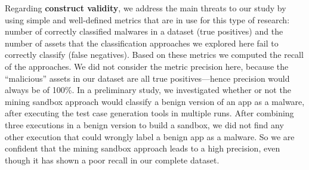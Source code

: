 \begin{comment}
    
Regarding the \textbf{correlation between dataset properties and accuracy drop}, after running statistical tests (logistic regression),
we could not find evidence that the \emph{diversity} of the
complete dataset---in terms of similarity score and types of malware-
is responsible for the higher number of false negatives of the mining
sandbox approach. This implies that there was no 1-1 correlation between the brackets of similarity index, malware types to the drops in accuracy. Therefore, further research is necessary to investigate
other possible reasons for that. Perhaps, the complete dataset
contains a large percentage of malware that use more
advanced techniques to evade from both static and dynamic analysis---
both methods are used in the mining sandbox approach
we discussed in this paper.


\end{comment}



Regarding {\bf construct validity}, we address the main threats
to our study by using simple and well-defined metrics that are
in use for this type of research: number of correctly classified
malwares in a dataset (true positives) and the number of assets that the
classification approaches we explored here fail to
correctly classify (false negatives). Based on these metrics we computed
the recall of the approaches. We did not consider the
metric precision here, because the ``malicious'' assets in our
dataset are all true positives---hence precision would
always be of 100\%. In a preliminary study, we
investigated whether or not the mining sandbox approach
would classify a benign version of an app as a malware,
after executing the test case generation tools in multiple
runs. After combining three executions in a benign version to
build a sandbox, we did not find any other execution that
could wrongly label a benign app as a malware. So we are
confident that the mining sandbox approach leads to a
high precision, even though it has shown a poor recall
in our complete dataset. 

